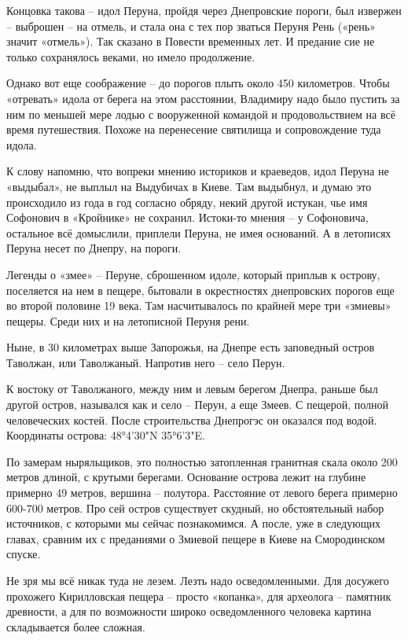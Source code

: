 Концовка такова – идол Перуна, пройдя через Днепровские пороги, был извержен – выброшен – на отмель, и стала она с тех пор зваться Перуня Рень («рень» значит «отмель»). Так сказано в Повести временных лет. И предание сие не только сохранялось веками, но имело продолжение.

Однако вот еще соображение – до порогов плыть около 450 километров. Чтобы «отревать» идола от берега на этом расстоянии, Владимиру надо было пустить за ним по меньшей мере лодью с вооруженной командой и продовольствием на всё время путешествия. Похоже на перенесение святилища и сопровождение туда идола.

К слову напомню, что вопреки мнению историков и краеведов, идол Перуна не «выдыбал», не выплыл на Выдубичах в Киеве. Там выдыбнул, и думаю это происходило из года в год согласно обряду, некий другой истукан, чье имя Софонович в «Кройнике»\cite{sofonovich01} не сохранил. Истоки-то мнения – у Софоновича, остальное всё домыслили, приплели Перуна, не имея оснований. А в летописях Перуна несет по Днепру, на пороги.

Легенды о «змее» – Перуне, сброшенном идоле, который приплыв к острову, поселяется на нем в пещере, бытовали в окрестностях днепровских порогов еще во второй половине 19 века. Там насчитывалось по крайней мере три «змиевы» пещеры. Среди них и на летописной Перуня рени.

Ныне, в 30 километрах выше Запорожья, на Днепре есть заповедный остров Таволжан, или Таволжаный. Напротив него – село Перун.

К востоку от Таволжаного, между ним и левым берегом Днепра, раньше был другой остров, назывался как и село – Перун, а еще Змеев. С пещерой, полной человеческих костей. После строительства Днепрогэс он оказался под водой. Координаты острова: 48°4'30"N 35°6'3"E.

По замерам ныряльщиков, это полностью затопленная гранитная скала около 200 метров длиной, с крутыми берегами. Основание острова лежит на глубине примерно 49 метров, вершина – полутора. Расстояние от левого берега примерно 600-700 метров. Про сей остров существует скудный, но обстоятельный набор источников, с которыми мы сейчас познакомимся. А после, уже в следующих главах, сравним их с преданиями о Змиевой пещере в Киеве на Смородинском спуске. 

Не зря мы всё никак туда не лезем. Лезть надо осведомленными. Для досужего прохожего Кирилловская пещера – просто «копанка», для археолога – памятник древности, а для по возможности широко осведомленного человека картина складывается более сложная.

